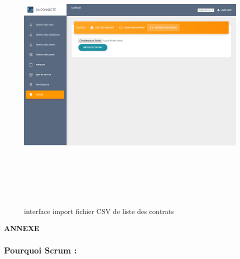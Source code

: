 \documentclass{article}
\begin{document}
\begin{figure}[H]
\centering
\vspace*{0.8in}
\includegraphics[height=5.4in]{importCSV.PNG}
\caption[Figure21 : interface import fichier CSV de liste des contrats ]{interface import fichier CSV de liste des contrats}
\label{fig:pic13}
\end{figure}

\begin{titlepage}\centering
\vspace*{\fill}
\textbf{\LARGE ANNEXE }
\vspace*{\fill}
\end{titlepage}
\setcounter{page}{41}
\appendix
\subsubsection*{Pourquoi Scrum :}
\vspace{0.5cm}
\vspace{0.3cm}
\end{document}
